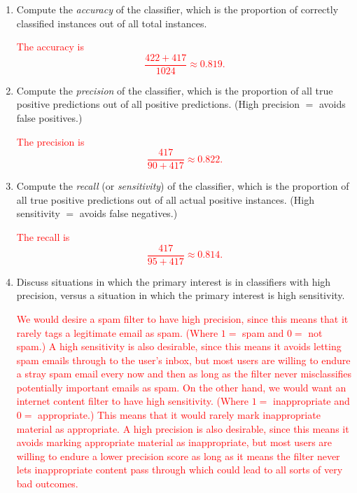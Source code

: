 \documentclass[12pt,reqno]{amsart}
\begin{document}
\medskip
\begin{enumerate}
\item Compute the \textit{accuracy} of the classifier, which is the proportion of correctly classified instances out of all total instances.

\bigskip
\textcolor{red}{The accuracy is
	\[\frac{422 + 417}{1024} \approx 0.819.
	\]}
\bigskip

\item Compute the \textit{precision} of the classifier, which is the proportion of all true positive predictions out of all positive predictions. (High precision $=$ avoids false positives.)

\bigskip
\textcolor{red}{The precision is
	\[\frac{417}{90 + 417} \approx 0.822.
	\]}
\bigskip

\item Compute the \textit{recall} (or \textit{sensitivity}) of the classifier, which is the proportion of all true positive predictions out of all actual positive instances. (High sensitivity $=$ avoids false negatives.)

\bigskip
\textcolor{red}{The recall is
	\[\frac{417}{95 + 417} \approx 0.814.
	\]}
\bigskip

\item Discuss situations in which the primary interest is in classifiers with high precision, versus a situation in which the primary interest is high sensitivity.

\bigskip
\textcolor{red}{We would desire a spam filter to have high precision, since this means that it rarely tags a legitimate email as spam. (Where $1=$ spam and $0=$ not spam.) A high sensitivity is also desirable, since this means it avoids letting spam emails through to the user's inbox, but most users are willing to endure a stray spam email every now and then as long as the filter never misclassifies potentially important emails as spam. On the other hand, we would want an internet content filter to have high sensitivity. (Where $1=$ inappropriate and $0=$ appropriate.) This means that it would rarely mark inappropriate material as appropriate. A high precision is also desirable, since this means it avoids marking appropriate material as inappropriate, but most users are willing to endure a lower precision score as long as it means the filter never lets inappropriate content pass through which could lead to all sorts of very bad outcomes.}
\bigskip
\end{enumerate}
\end{document}
